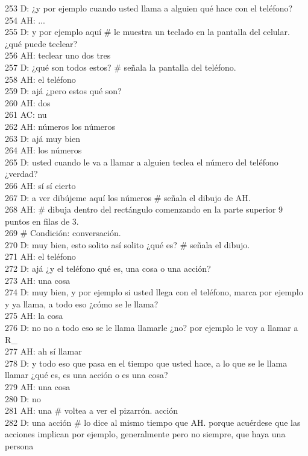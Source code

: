 253 D: ¿y por ejemplo cuando usted llama a alguien qué hace con el teléfono?\\
254 AH: ...\\
255 D: y por ejemplo aquí \# le muestra un teclado en la pantalla del celular. ¿qué puede teclear?\\
256 AH: teclear uno dos tres\\
257 D: ¿qué son todos estos? \# señala la pantalla del teléfono.\\
258 AH: el teléfono\\
259 D: ajá ¿pero estos qué son?\\
260 AH: dos\\
261 AC: nu\\
262 AH: números los números\\
263 D: ajá muy bien\\
264 AH: los números\\
265 D: usted cuando le va a llamar a alguien teclea el número del teléfono ¿verdad?\\
266 AH: sí sí cierto\\
267 D: a ver dibújeme aquí los números \# señala el dibujo de AH.\\
268 AH: \# dibuja dentro del rectángulo comenzando en la parte superior 9 puntos en filas de 3.\\
269 \# Condición: conversación.\\
270 D: muy bien, esto solito así solito ¿qué es? \# señala el dibujo.\\
271 AH: el teléfono\\
272 D: ajá ¿y el teléfono qué es, una cosa o una acción?\\
273 AH: una cosa\\
274 D: muy bien, y por ejemplo si usted llega con el teléfono, marca por ejemplo y ya llama, a todo eso ¿cómo se le llama?\\
275 AH: la cosa\\
276 D: no no a todo eso se le llama llamarle ¿no? por ejemplo le voy a llamar a R\_\\
277 AH: ah sí llamar\\
278 D: y todo eso que pasa en el tiempo que usted hace, a lo que se le llama llamar ¿qué es, es una acción o es una cosa?\\
279 AH: una cosa\\
280 D: no\\
281 AH: una \# voltea a ver el pizarrón. acción\\
282 D: una acción \# lo dice al mismo tiempo que AH. porque acuérdese que las acciones implican por ejemplo, generalmente pero no siempre, que haya una persona\\

